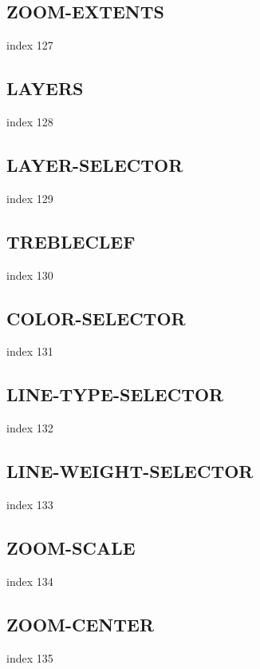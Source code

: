 \documentclass[a4paper]{report}
\begin{document}
\subsection{ZOOM-EXTENTS}

index 127

\subsection{LAYERS}

index 128

\subsection{LAYER-SELECTOR}

index 129

\subsection{TREBLECLEF}

index 130

\subsection{COLOR-SELECTOR}

index 131

\subsection{LINE-TYPE-SELECTOR}

index 132

\subsection{LINE-WEIGHT-SELECTOR}

index 133

\subsection{ZOOM-SCALE}

index 134

\subsection{ZOOM-CENTER}

index 135
\end{document}
